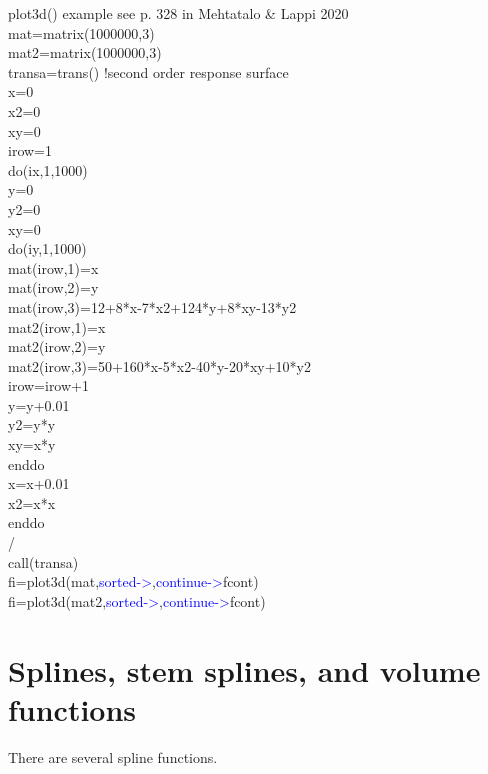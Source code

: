 \begin{example}plot3d() example see p.  328 in Mehtatalo & Lappi 2020\\
\label{plot3dex}
mat=\textcolor{VioletRed}{matrix}(1000000,3)\\
mat2=\textcolor{VioletRed}{matrix}(1000000,3)\\
transa=\textcolor{VioletRed}{trans}() !second order response surface\\
x=0\\
x2=0\\
xy=0\\
irow=1\\
\textcolor{VioletRed}{do}(ix,1,1000)\\
y=0\\
y2=0\\
xy=0\\
\textcolor{VioletRed}{do}(iy,1,1000)\\
mat(irow,1)=x\\
mat(irow,2)=y\\
mat(irow,3)=12+8*x-7*x2+124*y+8*xy-13*y2\\
mat2(irow,1)=x\\
mat2(irow,2)=y\\
mat2(irow,3)=50+160*x-5*x2-40*y-20*xy+10*y2\\
irow=irow+1\\
y=y+0.01\\
y2=y*y\\
xy=x*y\\
enddo\\
x=x+0.01\\
x2=x*x\\
enddo\\
/\\
\textcolor{VioletRed}{call}(transa)\\
fi=\textcolor{VioletRed}{plot3d}(mat,\textcolor{blue}{sorted->},\textcolor{blue}{continue->}fcont)\\
fi=\textcolor{VioletRed}{plot3d}(mat2,\textcolor{blue}{sorted->},\textcolor{blue}{continue->}fcont)
\end{example}

\section{Splines, stem splines,  and volume functions}
\label{spline}
There are several spline functions.

